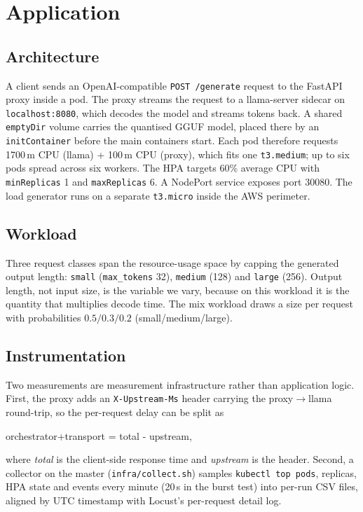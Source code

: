 \documentclass[conference]{IEEEtran}
\newcommand{\code}[1]{\texttt{#1}}
\begin{document}
\section{Application}
\label{sec:app}

\subsection{Architecture}

A client sends an OpenAI-compatible \code{POST /generate} request to the
FastAPI proxy inside a pod. The proxy streams the request to a llama-server
sidecar on \code{localhost:8080}, which decodes the model and streams tokens
back. A shared \code{emptyDir} volume carries the quantised GGUF model, placed
there by an \code{initContainer} before the main containers start. Each pod
therefore requests 1700\,m CPU (llama) + 100\,m CPU (proxy), which fits one
\code{t3.medium}; up to six pods spread across six workers. The HPA targets
60\% average CPU with \code{minReplicas} 1 and \code{maxReplicas} 6. A
NodePort service exposes port 30080. The load generator runs on a separate
\code{t3.micro} inside the AWS perimeter.

\subsection{Workload}

Three request classes span the resource-usage space by capping the generated
output length: \code{small} (\code{max\_tokens} 32), \code{medium} (128) and
\code{large} (256). Output length, not input size, is the variable we vary,
because on this workload it is the quantity that multiplies decode time. The
mix workload draws a size per request with probabilities $0.5/0.3/0.2$
(small/medium/large).

\subsection{Instrumentation}

Two measurements are measurement infrastructure rather than application
logic. First, the proxy adds an \code{X-Upstream-Ms} header carrying the
proxy$\to$llama round-trip, so the per-request delay can be split as
\begin{center}
\textrm{orchestrator}+\textrm{transport}
= \textrm{total} - \textrm{upstream},
\end{center}
where \emph{total} is the client-side response time and \emph{upstream} is the
header. Second, a collector on the master (\code{infra/collect.sh}) samples
\code{kubectl top pods}, replicas, HPA state and events every minute (20\,s in
the burst test) into per-run CSV files, aligned by UTC timestamp with Locust's
per-request detail log.
\end{document}
